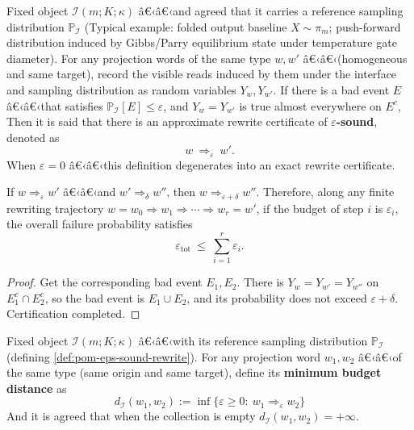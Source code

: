 \begin{definition}\label{def:pom-eps-sound-rewrite}
Fixed object \(\mathcal{I}(m;K;\kappa)\) â€‹â€‹and agreed that it carries a reference sampling distribution \(\mathbb{P}_{\mathcal I}\)
(Typical example: folded output baseline \(X\sim\pi_m\); push-forward distribution induced by Gibbs/Parry equilibrium state under temperature gate diameter).
For any projection words of the same type \(w,w'\) â€‹â€‹(homogeneous and same target), record the visible reads induced by them under the interface and sampling distribution as random variables
\(
Y_w,Y_{w'}.
\)
If there is a bad event \(E\) â€‹â€‹that satisfies \(\mathbb{P}_{\mathcal I}[E]\le \varepsilon\), and \(Y_w=Y_{w'}\) is true almost everywhere on \(E^c\),
Then it is said that there is an approximate rewrite certificate of \textbf{\(\varepsilon\)-sound}, denoted as
$$
w\ \Longrightarrow_{\varepsilon}\ w'.
$$
When \(\varepsilon=0\) â€‹â€‹this definition degenerates into an exact rewrite certificate.
\end{definition}

\begin{proposition}\label{prop:pom-eps-sound-compose}
If \(w\Longrightarrow_{\varepsilon}w'\) â€‹â€‹and \(w'\Longrightarrow_{\delta}w''\), then \(w\Longrightarrow_{\varepsilon+\delta}w''\).
Therefore, along any finite rewriting trajectory \(w=w_0\Rightarrow w_1\Rightarrow\cdots\Rightarrow w_r=w'\), if the budget of step \(i\) is \(\varepsilon_i\), the overall failure probability satisfies
\[
\varepsilon_{\mathrm{tot}}\ \le\ \sum_{i=1}^{r}\varepsilon_i.
\]
\end{proposition}
\begin{proof}
Get the corresponding bad event \(E_1,E_2\).
There is \(Y_w=Y_{w'}=Y_{w''}\) on \(E_1^c\cap E_2^c\), so the bad event is \(E_1\cup E_2\), and its probability does not exceed \(\varepsilon+\delta\). Certification completed.
\end{proof}

\begin{definition}\label{def:pom-eps-distance}
Fixed object \(\mathcal{I}(m;K;\kappa)\) â€‹â€‹with its reference sampling distribution \(\mathbb{P}_{\mathcal I}\) (defining \ref{def:pom-eps-sound-rewrite}).
For any projection word \(w_1,w_2\) â€‹â€‹of the same type (same origin and same target), define its \textbf{minimum budget distance} as
\[
\boxed{\;
d_{\mathcal I}(w_1,w_2)
:=
\inf\{\varepsilon\ge 0:\ w_1\Longrightarrow_{\varepsilon} w_2\}\;}
\]
And it is agreed that when the collection is empty \(d_{\mathcal I}(w_1,w_2)=+\infty\).
\end{definition}

